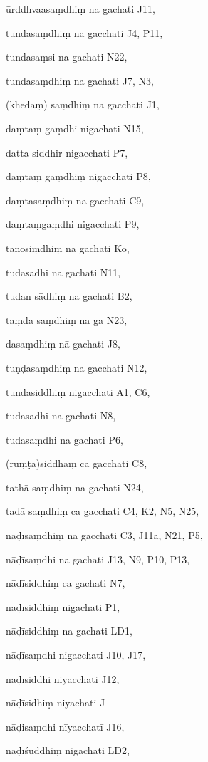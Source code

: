 \begin{marma}[hp03_065]


\item[ūrddhvaasaṃdhiṃ na gachati] J11,
\item[tundasaṃdhiṃ na gacchati] J4, P11, 
\item[tundasaṃsi na gachati] N22,
\item[tundasaṃdhiṃ na gachati] J7, N3, 
\item[(khedaṃ) saṃdhiṃ na gacchati] J1,
\item[daṃtaṃ gaṃdhi nigachati] N15,
\item[datta siddhir nigacchati] P7,
\item[daṃtaṃ gaṃdhiṃ nigacchati] P8,
\item[daṃtasaṃdhiṃ na gacchati] C9,
\item[daṃtaṃgaṃdhi nigacchati] P9,
\item[tanosiṃdhiṃ na gachati] Ko,
\item[tudasadhi na gachati] N11,
\item[tudan sādhiṃ na gachati] B2,
\item[taṃda saṃdhiṃ na ga] N23,
\item[dasaṃdhiṃ nā gachati] J8,
\item[tuṇḍasaṃdhiṃ na gacchati] N12,
\item[tundasiddhiṃ nigacchati] A1, C6, 
\item[tudasadhi na gachati] N8,
\item[tudasaṃdhi na gachati] P6,
\item[(ruṃṭa)siddhaṃ ca gacchati] C8,
\item[tathā saṃdhiṃ na gachati] N24,
\item[tadā saṃdhiṃ ca gacchati] C4, K2, N5, N25, 
\item[nāḍīsaṃdhiṃ na gacchati] C3, J11a, N21, P5, 
\item[nāḍīsaṃdhi na gachati] J13, N9, P10, P13, 
\item[nāḍīsiddhiṃ ca gachati] N7,
\item[nāḍīsiddhiṃ nigachati] P1,
\item[nāḍīsiddhiṃ na gachati] LD1,
\item[nāḍīsaṃdhi nigacchati] J10, J17, 
\item[nāḍīsiddhi niyacchati] J12,
\item[nāḍīsidhiṃ niyachati] J
\item[nāḍisaṃdhi nīyacchatī] J16,
\item[nāḍīśuddhiṃ nigachati] LD2,

\end{marma}
